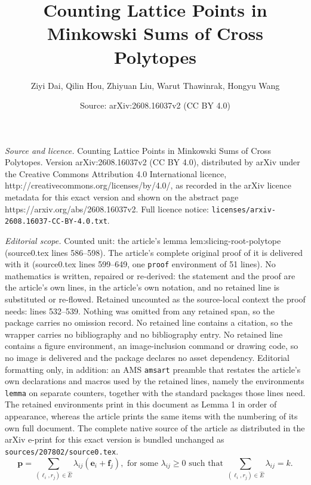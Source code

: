 \documentclass[10pt,a4paper]{amsart}
\title{Counting Lattice Points in Minkowski Sums of Cross Polytopes}
\author{Ziyi Dai, Qilin Hou, Zhiyuan Liu, Warut Thawinrak, Hongyu Wang}
\date{Source: arXiv:2608.16037v2 (CC BY 4.0)}
\newcommand{\vct}[1]{\boldsymbol{#1}}
\begin{document}
\maketitle

\noindent\emph{Source and licence.} Counting Lattice Points in Minkowski Sums of Cross Polytopes. Version arXiv:2608.16037v2 (CC BY 4.0), distributed by arXiv under the Creative Commons Attribution 4.0 International licence, http://creativecommons.org/licenses/by/4.0/, as recorded in the arXiv licence metadata for this exact version and shown on the abstract page https://arxiv.org/abs/2608.16037v2. Full licence notice: \texttt{licenses/arxiv-2608.16037-CC-BY-4.0.txt}.\par\smallskip

\noindent\textit{Editorial scope.} Counted unit: the article's lemma lem:slicing-root-polytope (source0.tex lines 586--598). The article's complete original proof of it is delivered with it (source0.tex lines 599--649, one \texttt{proof} environment of 51 lines). No mathematics is written, repaired or re-derived: the statement and the proof are the article's own lines, in the article's own notation, and no retained line is substituted or re-flowed.  Retained uncounted as the source-local context the proof needs: lines 532--539.  Nothing was omitted from any retained span, so the package carries no omission record.  No retained line contains a citation, so the wrapper carries no bibliography and no bibliography entry.  No retained line contains a figure environment, an image-inclusion command or drawing code, so no image is delivered and the package declares no asset dependency.  Editorial formatting only, in addition: an AMS \texttt{amsart} preamble that restates the article's own declarations and macros used by the retained lines, namely the environments \texttt{lemma} on separate counters, together with the standard packages those lines need.  The retained environments print in this document as Lemma 1 in order of appearance, whereas the article prints the same items with the numbering of its own full document.  The complete native source of the article as distributed in the arXiv e-print for this exact version is bundled unchanged as \texttt{sources/207802/source0.tex}.
\begin{equation}
\vct{p}
=\sum_{(\ell_i,r_j)\in\widehat E}\lambda_{ij}(\vct{e}_i+\vct{f}_j),
\text{ for some }
\lambda_{ij}\ge0 \text{ such that }
\sum_{(\ell_i,r_j)\in\widehat E}\lambda_{ij}=k.
\label{eq:flow}
\end{equation}
\end{document}
